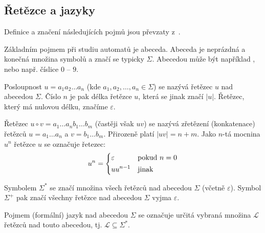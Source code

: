 \subsection{Řetězce a jazyky}
Definice a značení následujících pojmů jsou převzaty z~\cite{Koz-AutComp}.

Základním pojmem při studiu automatů je abeceda. Abeceda je neprázdná a konečná množina symbolů a značí se typicky $\Sigma$. Abecedou může být například , nebo např. číslice $0$ -- $9$.

Posloupnost $u = a_1 a_2 \dots a_n$ (kde $a_1,  a_2, \dots, a_n \in \Sigma$) se nazývá řetězec $u$ nad abecedou $\Sigma$. Číslo $n$ je pak délka řetězce $u$, která se jinak značí $|u|$. Řetězec, který má nulovou délku, značíme $\varepsilon$.

Řetězec $u \circ v = a_1 \dots a_n b_1 \dots b_m$ (častěji však $uv$) se nazývá zřetězení (konkatenace) řetězců $u = a_1 \dots a_n$ a $v = b_1 \dots b_m$. Přirozeně platí $|uv| = n + m$. Jako $n$-tá mocnina $u^n$ řetězce $u$ se označuje řetezec:
$$
  u^n = \begin{dcases}
    \varepsilon & \text{pokud } n = 0\\
    u u^{n-1} & \text{jinak}
  \end{dcases}
$$

Symbolem $\Sigma^*$ se značí množina všech řetězců nad abecedou $\Sigma$ (včetně $\varepsilon$). Symbol $\Sigma^+$ pak značí všechny řetězce nad abecedou $\Sigma$ vyjma $\varepsilon$. 

Pojmem (formální) jazyk nad abecedou $\Sigma$ se označuje určitá vybraná množina $\mathcal{L}$ řetězců nad touto abecedou, tj. $\mathcal{L} \subseteq \Sigma^*$.

%   

